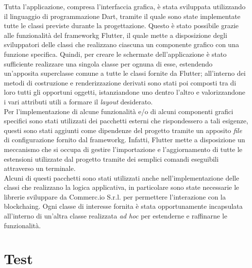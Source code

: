 Tutta l'applicazione, compresa l'interfaccia grafica, è stata sviluppata utilizzando il linguaggio di programmazione Dart, tramite il quale sono state implementate tutte le classi previste durante la progettazione. Questo è stato possibile grazie alle funzionalità del \gls{frameworkg} Flutter, il quale mette a disposizione degli sviluppatori delle classi che realizzano ciascuna un componente grafico con una funzione specifica. Quindi, per creare le schermate dell'applicazione è stato sufficiente realizzare una singola classe per ognuna di esse, estendendo un'apposita superclasse comune a tutte le classi fornite da Flutter; all'interno dei metodi di costruzione e renderizzazione derivati sono stati poi composti tra di loro tutti gli opportuni oggetti, istanziandone uno dentro l'altro e valorizzandone i vari attributi utili a formare il \textit{layout} desiderato.\\
Per l'implementazione di alcune funzionalità e/o di alcuni componenti grafici specifici sono stati utilizzati dei pacchetti esterni che rispondessero a tali esigenze, questi sono stati aggiunti come dipendenze del progetto tramite un apposito \textit{file} di configurazione fornito dal \gls{frameworkg}. Infatti, Flutter mette a disposizione un meccanismo che si occupa di gestire l'importazione e l'aggiornamento di tutte le estensioni utilizzate dal progetto tramite dei semplici comandi eseguibili attraverso un terminale.\\ 
Alcuni di questi pacchetti sono stati utilizzati anche nell'implementazione delle classi che realizzano la logica applicativa, in particolare sono state necessarie le librerie sviluppare da Commerc.io S.r.l. per permettere l'interazione con la \gls{blockchaing}. Ogni classe di interesse fornita è stata opportunamente incapsulata all'interno di un'altra classe realizzata \textit{ad hoc} per estenderne e raffinarne le funzionalità.

\section{Test}

